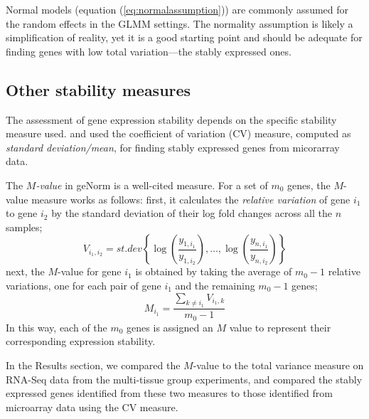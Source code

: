 	Normal models (equation (\ref{eq:normalassumption})) are commonly assumed for
	the random effects in the GLMM settings. The normality assumption is likely a
	simplification of reality, yet it is a good starting point and should be
	adequate for finding genes with low total variation---the stably expressed
	ones.
	
	\subsection{Other stability measures}\label{subsection:OtherStabilityMeasure}
	The assessment of gene expression stability depends on the specific stability
	measure used. 
	\cite{czechowski2005genome} and \cite{dekkers2012identification} used  the
	coefficient of variation (CV) measure, computed as \textit{standard
		deviation/mean}, for finding stably expressed genes from micorarray data.
	
	
	The \textit{$M$-value} in geNorm \citep{vandesompele2002accurate} is a
	well-cited measure. For a set of $m_0$ genes, the $M$-value measure works as
	follows: first, it calculates the \textit{relative variation} of gene $i_1$ to
	gene $i_2$ by the standard deviation of their log fold changes
	across all the $n$ samples; 
	\[V_{i_1, i_2} =\textit{st.dev} \left\{\log\left(\dfrac{y_{1,i_1}}{y_{1, i_2}}\right),\ldots, \log\left(\dfrac{y_{n, i_1}}{y_{n, i_2}}\right) \right\}\]
	next, the $M$-value for gene 
	$i_1$ is obtained by taking the average of $m_0-1$ relative variations, one
	for each pair of gene $i_1$ and the remaining $m_0-1$ genes;
	\[M_{i_1} = \frac{\sum_{k\neq i_1}V_{i_1, k}}{m_0-1}\] 
	In this way,  each of the $m_0$ genes is assigned an $M$ value to represent their corresponding expression stability. 
	
	
	In the Results section, we compared the $M$-value to the total variance measure
	on RNA-Seq data from the multi-tissue group experiments, and compared the
	stably expressed genes identified from these two measures to those identified
	from microarray data using the CV measure.
	
	
